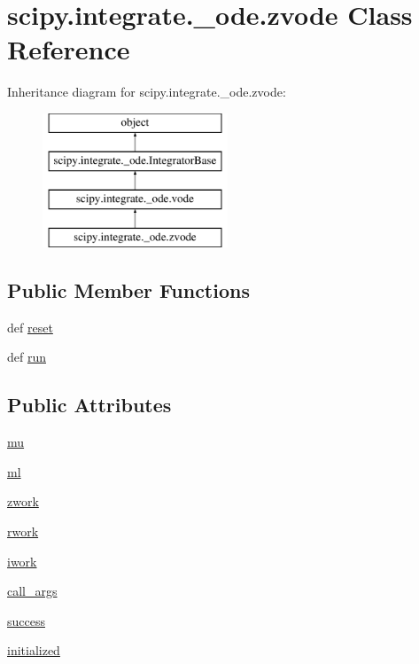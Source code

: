 \hypertarget{classscipy_1_1integrate_1_1__ode_1_1zvode}{}\section{scipy.\+integrate.\+\_\+ode.\+zvode Class Reference}
\label{classscipy_1_1integrate_1_1__ode_1_1zvode}
Inheritance diagram for scipy.\+integrate.\+\_\+ode.\+zvode\+:\begin{figure}[H]
\begin{center}
\leavevmode
\includegraphics[height=4.000000cm]{classscipy_1_1integrate_1_1__ode_1_1zvode}
\end{center}
\end{figure}
\subsection*{Public Member Functions}
\begin{DoxyCompactItemize}
\item 
def \hyperlink{classscipy_1_1integrate_1_1__ode_1_1zvode_a1cadd5632eb826fa22fd18c38e0e6447}{reset}
\item 
def \hyperlink{classscipy_1_1integrate_1_1__ode_1_1zvode_a12572ccdeaef1fc4b3bfe0b74eba39e3}{run}
\end{DoxyCompactItemize}
\subsection*{Public Attributes}
\begin{DoxyCompactItemize}
\item 
\hyperlink{classscipy_1_1integrate_1_1__ode_1_1zvode_a626ae2a37fde0a78c7a6f0b6fe5351b7}{mu}
\item 
\hyperlink{classscipy_1_1integrate_1_1__ode_1_1zvode_abf231eed0c9c7cca1d8a4c43c700e407}{ml}
\item 
\hyperlink{classscipy_1_1integrate_1_1__ode_1_1zvode_a7e1b71c02529147df0c06cc803d7dc24}{zwork}
\item 
\hyperlink{classscipy_1_1integrate_1_1__ode_1_1zvode_a02cc718204d8a88850481edd133bdcb9}{rwork}
\item 
\hyperlink{classscipy_1_1integrate_1_1__ode_1_1zvode_a826474a03505f654233817beaa222038}{iwork}
\item 
\hyperlink{classscipy_1_1integrate_1_1__ode_1_1zvode_a505c95cdda1a2dc7db0d8eaf5ef27a4e}{call\+\_\+args}
\item 
\hyperlink{classscipy_1_1integrate_1_1__ode_1_1zvode_ae322a76079b22775b184ffb5e373ec8b}{success}
\item 
\hyperlink{classscipy_1_1integrate_1_1__ode_1_1zvode_a9087b8afbec9343bb269c1b10c585368}{initialized}
\end{DoxyCompactItemize}
